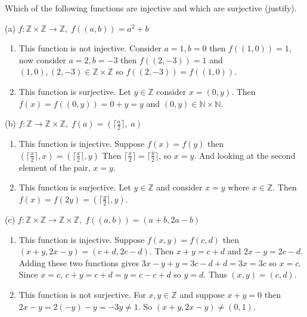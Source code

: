 \documentclass{article}
\begin{document}
    Which of the following functions are injective and which are surjective (justify).

    (a) $f:\mathbb{Z}\times\mathbb{Z}\rightarrow\mathbb{Z},\; f((a,b))=a^2+b$

    \begin{enumerate}[label=\quad\quad, leftmargin=*]
        \item 
        This function is not injective. Consider $a=1,b=0$ then $f((1,0))=1$, now consider 
        $a=2,b=-3$ then $f((2,-3))=1$ and $(1,0),(2,-3)\in\mathbb{Z}\times\mathbb{Z}$ 
        so $f((2,-3))=f((1,0))$.
        \item
        This function is surjective. Let $y\in\mathbb{Z}$ consider $x=(0,y)$. 
        Then $f(x)=f((0,y)) = 0+y=y$ and $(0,y)\in\mathbb{N}\times\mathbb{N}$.
    \end{enumerate}

    (b) $f:\mathbb{Z}\rightarrow\mathbb{Z}\times\mathbb{Z},\; f(a) = (\lceil\frac{a}{2}\rceil,\; a)$

    \begin{enumerate}[label=\quad\quad, leftmargin=*]
        \item 
        This function is injective. Suppose $f(x)=f(y)$ then $(\lceil\frac{x}{2}\rceil, x) = (\lceil\frac{x}{2}\rceil, y)$
        Then $\lceil\frac{x}{2}\rceil = \lceil\frac{y}{2}\rceil$, so $x=y$.
        And looking at the second element of the pair, $x=y$.
        \item
        This function is surjective. Let $y\in\mathbb{Z}$ and consider $x=y$ where $x\in\mathbb{Z}$.
        Then $f(x)=f(2y)=(\lceil\frac{y}{2}\rceil,y)$. 
    \end{enumerate}

    (c) $f:\mathbb{Z}\times\mathbb{Z}\rightarrow\mathbb{Z}\times\mathbb{Z},\; f((a,b))=(a+b,2a-b)$

    \begin{enumerate}[label=\quad\quad, leftmargin=*]
        \item 
        This function is injective. Suppose $f(x,y)=f(c,d)$ then $(x+y,2x-y)=(c+d, 2c-d)$. 
        Then $x+y = c+d$ and $2x-y=2c-d$. Adding these two functions gives $3x-y+y=3c-d+d = 
        3x=3c$ so $x=c$. Since $x=c$, $c+y=c+d=y=c-c+d$ so $y=d$. Thus $(x,y)=(c,d)$.
        \item
        This function is not surjective. For $x,y\in\mathbb{Z}$ and suppose $x+y=0$ then 
        $2x-y = 2(-y)-y = -3y \neq 1$. So $(x+y, 2x-y)\neq(0,1)$.
    \end{enumerate}
\end{document}
